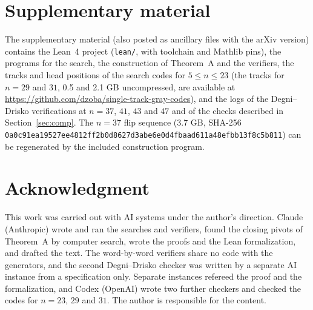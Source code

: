 \documentclass[journal,onecolumn,11pt]{IEEEtran}
\begin{document}
\section*{Supplementary material}
The supplementary material (also posted as ancillary files with the arXiv version) contains the Lean~4 project (\texttt{lean/}, with toolchain and Mathlib pins), the programs
for the search, the construction of Theorem~A and the verifiers, the tracks and head positions of the search codes for
$5\le n\le 23$ (the tracks for $n=29$ and $31$, 0.5 and 2.1 GB uncompressed, are available at \url{https://github.com/dzoba/single-track-gray-codes}), and the logs of the Degni--Drisko verifications at $n=37$, $41$, $43$ and $47$ and of the checks
described in Section~\ref{sec:comp}. The $n=37$ flip sequence (3.7 GB, SHA-256
\texttt{0a0c91ea19527ee4812ff2b0d8627d3a\allowbreak be6e0d4fbaad611a48efbb13f8c5b811}) can be regenerated by the included
construction program.

\section*{Acknowledgment}
This work was carried out with AI systems under the author's direction. Claude (Anthropic) wrote and ran the searches
and verifiers, found the closing pivots of Theorem~A by computer search, wrote the proofs and the Lean formalization,
and drafted the text. The word-by-word verifiers share no code with the generators, and the second
Degni--Drisko checker was written by a separate AI instance from a specification only. Separate instances refereed the
proof and the formalization, and Codex (OpenAI) wrote two further checkers and checked the codes for $n=23$, $29$ and
$31$. The author
is responsible for the content.
\end{document}
